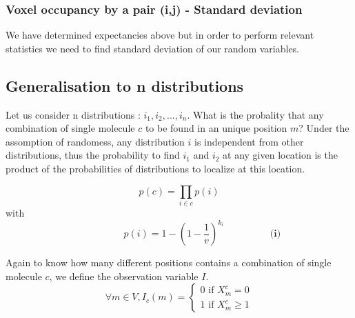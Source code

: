 \documentclass{article}
\begin{document}
\subsubsection{Voxel occupancy by a pair (i,j) - Standard deviation}

We have determined expectancies above but in order to perform relevant statistics we need to find standard deviation of our random variables.





\newpage
\subsection{Generalisation to n distributions}

Let us consider n distributions : $i_1, i_2, ..., i_n$. What is the probality that any combination of single molecule $c$ to be found in an unique position $m$?
Under the assomption of randomess, any distribution $i$ is independent from other distributions, thus the probability to find $i_1$ and $i_2$ at any given
location is the product of the probabilities of distributions to localize at this location.

\[
p(c) = \prod_{i \in c}p(i)
\]
with 
\begin{equation}
\hspace{2cm} p(i) = 1-(1-\frac{1}{v})^{k_i} \hspace{2cm} \textbf{(i)}
\end{equation}

Again to know how many different positions contains a combination of single molecule $c$, we define the observation variable $I$.
\[
\forall m \in V, I_c(m) = \begin{cases}
    0 \text{ if } X^c_m = 0 \\
    1 \text{ if } X^c_m \geq 1
\end{cases}
\]


\end{document}
